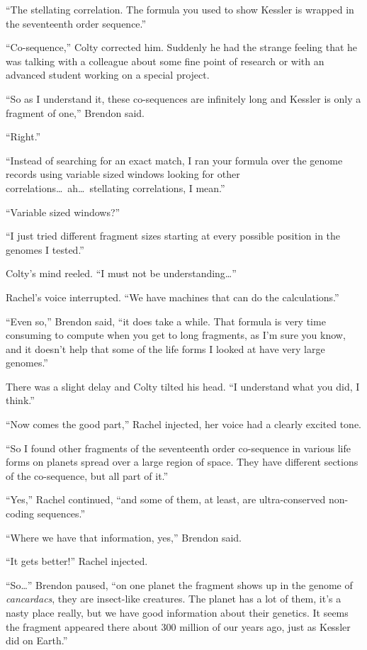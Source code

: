 ``The stellating correlation. The formula you used to show Kessler is wrapped in the seventeenth
order sequence.''

``Co-sequence,'' Colty corrected him. Suddenly he had the strange feeling that he was talking
with a colleague about some fine point of research or with an advanced student working on a
special project.

``So as I understand it, these co-sequences are infinitely long and Kessler is only a fragment
of one,'' Brendon said.

``Right.''

``Instead of searching for an exact match, I ran your formula over the genome records using
variable sized windows looking for other correlations\ldots\ ah\ldots\ stellating correlations,
I mean.''

``Variable sized windows?''

``I just tried different fragment sizes starting at every possible position in the genomes I
tested.''

Colty's mind reeled. ``I must not be understanding\ldots''

Rachel's voice interrupted. ``We have machines that can do the calculations.''

``Even so,'' Brendon said, ``it does take a while. That formula is very time consuming to
compute when you get to long fragments, as I'm sure you know, and it doesn't help that some of
the life forms I looked at have very large genomes.''

There was a slight delay and Colty tilted his head. ``I understand what you did, I think.''

``Now comes the good part,'' Rachel injected, her voice had a clearly excited tone.

``So I found other fragments of the seventeenth order co-sequence in various life forms on
planets spread over a large region of space. They have different sections of the co-sequence,
but all part of it.''

``Yes,'' Rachel continued, ``and some of them, at least, are ultra-conserved non-coding
sequences.''

``Where we have that information, yes,'' Brendon said.

``It gets better!'' Rachel injected.

``So\ldots'' Brendon paused, ``on one planet the fragment shows up in the genome of
\textit{cancardacs}, they are insect-like creatures. The planet has a lot of them, it's a nasty
place really, but we have good information about their genetics. It seems the fragment appeared
there about 300 million of our years ago, just as Kessler did on Earth.''

